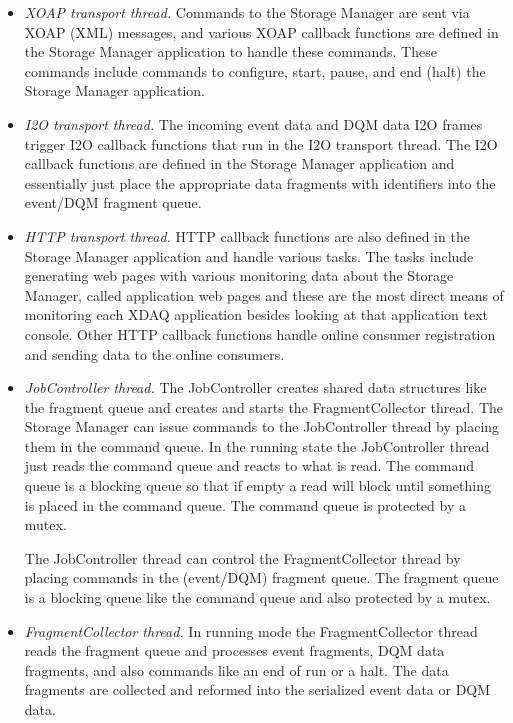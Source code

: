 \begin{itemize}
\item {\em XOAP transport thread.} Commands to the Storage Manager are sent
via XOAP (XML) messages, and various XOAP callback functions are defined in
the Storage Manager application to handle these commands. These commands
include commands to configure, start, pause, and end (halt)  the
Storage Manager application.

\item {\em I2O transport thread.} The incoming event data and DQM data I2O frames
trigger I2O callback functions that run in the I2O transport thread. The I2O callback
functions are defined in the Storage Manager application and essentially just place 
the appropriate data fragments with identifiers into
the event/DQM fragment queue.

\item {\em HTTP transport thread.} HTTP callback functions are also defined in
the Storage Manager application and handle various tasks. The tasks include
generating web pages with various monitoring data about the Storage Manager,
called application web pages and these are the most direct means of monitoring
each XDAQ application besides looking at that application text console. Other
HTTP callback functions handle online consumer registration and sending data
to the online consumers.

\item{\em JobController thread.} The JobController creates shared data structures like
the fragment queue and creates and starts the FragmentCollector thread. The Storage
Manager can issue commands to the JobController thread by placing them in the
command queue. In the running state the JobController thread just reads the
command queue and reacts to what is read. The command queue is a blocking queue
so that if empty a read will block until something is placed in the command queue. The 
command queue is protected by a mutex.

The JobController thread can control the FragmentCollector thread by placing
commands in the (event/DQM) fragment queue. The fragment queue is a blocking
queue like the command queue and also protected by a mutex.

\item{\em FragmentCollector thread.}  In running mode the FragmentCollector thread
reads the fragment queue and processes event fragments, DQM data fragments,
and also commands like an end of run or a halt. The data fragments are collected and
reformed into the serialized event data or DQM data. 


\end{itemize}
